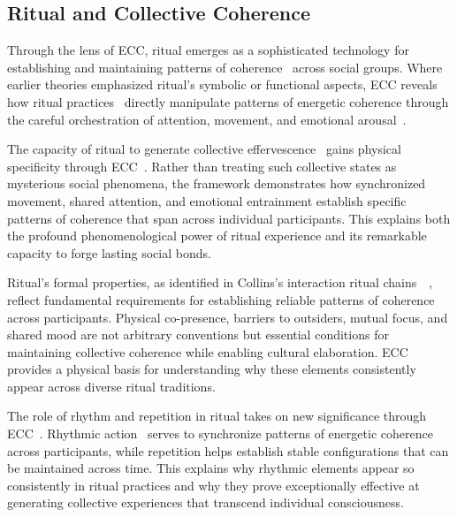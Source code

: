 \subsection*{Ritual and Collective Coherence~}

Through the lens of ECC, ritual emerges as a sophisticated technology for establishing and maintaining patterns of coherence~ across social groups. Where earlier theories emphasized ritual's symbolic or functional aspects, ECC reveals how ritual practices~ directly manipulate patterns of energetic coherence through the careful orchestration of attention, movement, and emotional arousal~\cite{kapferer2004ritual,bell1992ritual}.

The capacity of ritual to generate collective effervescence~ gains physical specificity through ECC~\cite{durkheim1995elementary}. Rather than treating such collective states as mysterious social phenomena, the framework demonstrates how synchronized movement, shared attention, and emotional entrainment establish specific patterns of coherence that span across individual participants. This explains both the profound phenomenological power of ritual experience and its remarkable capacity to forge lasting social bonds.

Ritual's formal properties, as identified in Collins's interaction ritual chains~~\cite{collins2004interaction}, reflect fundamental requirements for establishing reliable patterns of coherence across participants. Physical co-presence, barriers to outsiders, mutual focus, and shared mood are not arbitrary conventions but essential conditions for maintaining collective coherence while enabling cultural elaboration. ECC provides a physical basis for understanding why these elements consistently appear across diverse ritual traditions.

The role of rhythm and repetition in ritual takes on new significance through ECC~\cite{mcneill1995keeping,howes2003sensual}. Rhythmic action~ serves to synchronize patterns of energetic coherence across participants, while repetition helps establish stable configurations that can be maintained across time. This explains why rhythmic elements appear so consistently in ritual practices and why they prove exceptionally effective at generating collective experiences that transcend individual consciousness.

